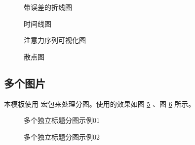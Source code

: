 \documentclass[report, twoside, UTF8, AutoFakeBold = 1, AutoFakeSlant, zihao = -4]{config}
\begin{document}
\begin{figure}[H]
    \centering
    \resizebox{1\columnwidth}{!}{
        
    }
    \caption{带误差的折线图} 
    \label{fig:line chart with error bar}
\end{figure}

\begin{figure}[H]
    \centering
    \resizebox{1\columnwidth}{!}{
        
    }
    \caption{时间线图} 
    \label{fig:timeline}
\end{figure}

\begin{figure}[H]
    \centering
    \resizebox{1\columnwidth}{!}{
        
    }
    \caption{注意力序列可视化图} 
    \label{fig:text attention}
\end{figure}

\begin{figure}[H]
    \centering
    
    \caption{散点图} 
    \label{fig:scatter diagram}
\end{figure}

\subsection{多个图片}

本模板使用  宏包来处理分图。使用的效果如图 \ref{fig:multi-image-01} 、图 \ref{fig:multi-image-02} 所示。

\begin{figure}[H]
    \centering
    \caption{多个独立标题分图示例01}
    \label{fig:multi-image-01}
\end{figure}

\begin{figure}[H]
    \centering
    \caption{多个独立标题分图示例02}
    \label{fig:multi-image-02}
\end{figure}
\end{document}

